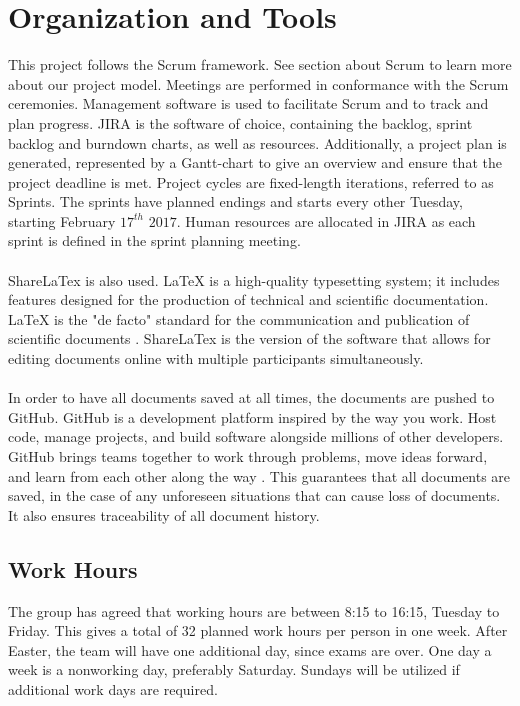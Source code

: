 \section{Organization and Tools}

This project follows the Scrum framework. See section about Scrum to learn more about our project model. Meetings are performed in conformance with the Scrum ceremonies. Management software is used to facilitate Scrum and to track and plan progress. JIRA is the software of choice, containing the backlog, sprint backlog and burndown charts, as well as resources. Additionally, a project plan is generated, represented by a Gantt-chart to give an overview and ensure that the project deadline is met. Project cycles are fixed-length iterations, referred to as Sprints. The sprints have planned endings and starts every other Tuesday, starting February $17^{th}$ $2017$. Human resources are allocated in JIRA as each sprint is defined in the sprint planning meeting.
\\\\
ShareLaTex is also used. LaTeX is a high-quality typesetting system; it includes features designed for the production of technical and scientific documentation. LaTeX is the "de facto" standard for the communication and publication of scientific documents \cite{latex}. ShareLaTex is the version of the software that allows for editing documents online with multiple participants simultaneously.  
\\\\
In order to have all documents saved at all times, the documents are pushed to GitHub. GitHub is a development platform inspired by the way you work. Host code, manage projects, and build software alongside millions of other developers. GitHub brings teams together to work through problems, move ideas forward, and learn from each other along the way \cite{github}. This guarantees that all documents are saved, in the case of any unforeseen situations that can cause loss of documents. It also ensures traceability of all document history. 

\subsection{Work Hours}

The group has agreed that working hours are between 8:15 to 16:15, Tuesday to Friday. This gives a total of 32 planned work hours per person in one week. After Easter, the team will have one additional day, since exams are over. One day a week is a nonworking day, preferably Saturday. Sundays will be utilized if additional work days are required. 


